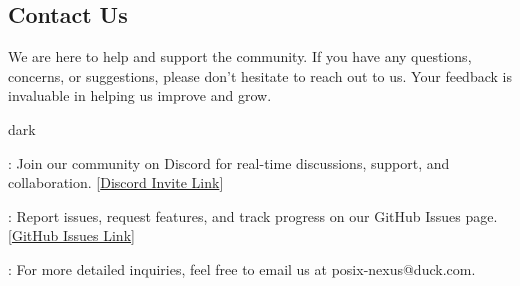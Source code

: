 \subsection{Contact Us}
\label{sec:start:sub:contact}
We are here to help and support the community.
If you have any questions, concerns, or suggestions, please don't hesitate to reach out to us.
Your feedback is invaluable in helping us improve and grow.
\bigskip
\begin{baseBoxOne}{}{dark}
    \begin{posnexItemize}
        \item[\sA] : Join our  community on Discord for real-time discussions, support, and collaboration. [\href{https://discord.gg/GB9twwpCNM}{Discord Invite Link}]
        \item[\sA] : Report issues, request features, and track progress on our GitHub Issues page. [\href{https://github.com/Canine-Table/posix-nexus/issues}{GitHub Issues Link}]
        \item[\sA] : For more detailed inquiries, feel free to email us at posix-nexus@duck.com.
    \end{posnexItemize}
\end{baseBoxOne}
